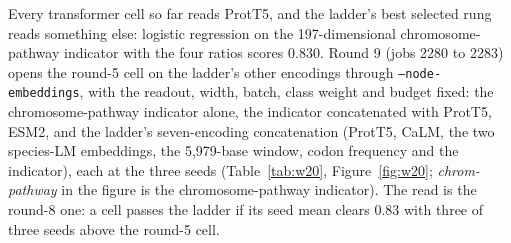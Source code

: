 Every transformer cell so far reads ProtT5, and the ladder's best selected rung reads
something else: logistic regression on the 197-dimensional chromosome-pathway indicator
with the four ratios scores 0.830. Round 9 (jobs 2280 to 2283) opens the round-5 cell on
the ladder's other encodings through \texttt{--node-embeddings}, with the readout, width,
batch, class weight and budget fixed: the chromosome-pathway indicator alone, the
indicator concatenated with ProtT5, ESM2, and the ladder's seven-encoding concatenation
(ProtT5, CaLM, the two species-LM embeddings, the 5,979-base window, codon frequency and
the indicator), each at the three seeds (Table~\ref{tab:w20}, Figure~\ref{fig:w20};
\emph{chrom-pathway} in the figure is the chromosome-pathway indicator). The read is the
round-8 one: a cell passes the ladder if its seed mean clears 0.83 with three of three
seeds above the round-5 cell.




